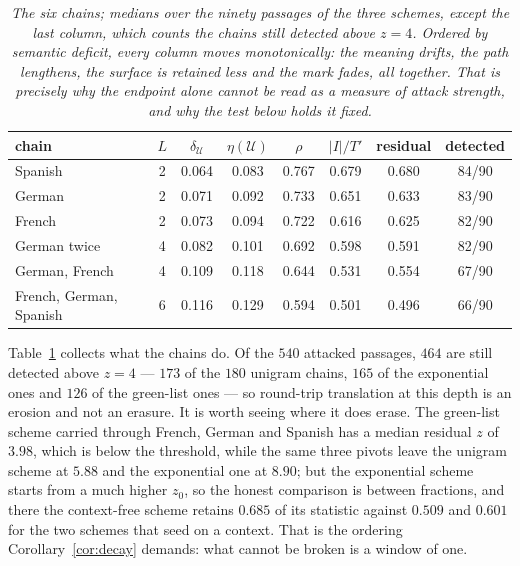 \documentclass{article}
\theoremstyle{plain}
\theoremstyle{definition}
\numberwithin{equation}{section}
\newcommand{\Uc}{\mathcal{U}}
\begin{document}
\begin{table}[t]
\centering
\small
\begin{tabular}{lccccccc}
\toprule
chain & $L$ & $\delta_\Uc$ & $\eta(\Uc)$ & $\rho$ & $|I|/T'$ &
residual & detected\\
\midrule
Spanish                 & 2 & 0.064 & 0.083 & 0.767 & 0.679 & 0.680 & 84/90\\
German                  & 2 & 0.071 & 0.092 & 0.733 & 0.651 & 0.633 & 83/90\\
French                  & 2 & 0.073 & 0.094 & 0.722 & 0.616 & 0.625 & 82/90\\
German twice            & 4 & 0.082 & 0.101 & 0.692 & 0.598 & 0.591 & 82/90\\
German, French          & 4 & 0.109 & 0.118 & 0.644 & 0.531 & 0.554 & 67/90\\
French, German, Spanish & 6 & 0.116 & 0.129 & 0.594 & 0.501 & 0.496 & 66/90\\
\bottomrule
\end{tabular}
\caption{\emph{The six chains; medians over the ninety passages of the
three schemes, except the last column, which counts the chains still
detected above $z = 4$. Ordered by semantic deficit, every column moves
monotonically: the meaning drifts, the path lengthens, the surface is
retained less and the mark fades, all together. That is precisely why
the endpoint alone cannot be read as a measure of attack strength, and
why the test below holds it fixed.}}
\label{tab:chains}
\end{table}

Table~\ref{tab:chains} collects what the chains do. Of the $540$
attacked passages, $464$ are still detected above $z = 4$ --- $173$ of
the $180$ unigram chains, $165$ of the exponential ones and $126$ of the
green-list ones --- so round-trip translation at this depth is an
erosion and not an erasure. It is worth seeing where it does erase. The
green-list scheme carried through French, German and Spanish has a
median residual $z$ of $3.98$, which is below the threshold, while the
same three pivots leave the unigram scheme at $5.88$ and the exponential
one at $8.90$; but the exponential scheme starts from a much higher
$z_0$, so the honest comparison is between fractions, and there the
context-free scheme retains $0.685$ of its statistic against $0.509$ and
$0.601$ for the two schemes that seed on a context. That is the ordering
Corollary~\ref{cor:decay} demands: what cannot be broken is a window of
one.
\end{document}
